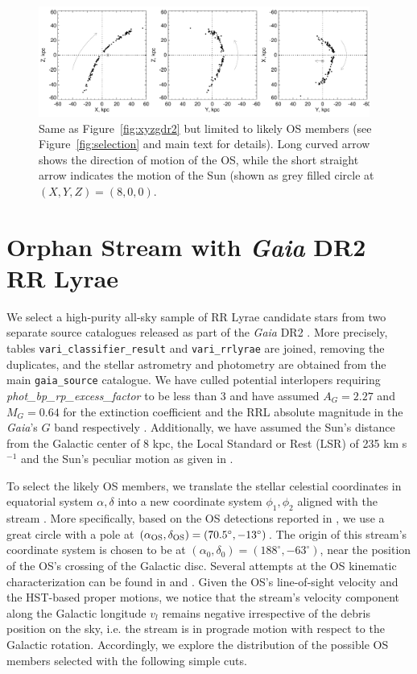 \documentclass[a4paper,useAMS,usenatbib]{mnras}
\newcommand{\Gaia}{{\it Gaia}}
\newcommand{\gaia}{\textit{Gaia} }
\begin{document}
%
\begin{figure}
  \centering
  \includegraphics[width=0.97\textwidth]{orphan_paper_xyz_members.pdf}
  \caption[]{Same as Figure~\ref{fig:xyzgdr2} but limited to likely OS
    members (see Figure~\ref{fig:selection} and main text for
    details). Long curved arrow shows the direction of motion of the
    OS, while the short straight arrow indicates the motion of the Sun
    (shown as grey filled circle at $(X,Y,Z)=(8,0,0)$.}
   \label{fig:xyzmem}
\end{figure}
%

\section{Orphan Stream with \gaia DR2 RR Lyrae}

We select a high-purity all-sky sample of RR Lyrae candidate stars
from two separate source catalogues released as part of the \gaia DR2
\citep[][]{Prusti2016, Brown2018}. More precisely, tables
\texttt{vari\_classifier\_result} and \texttt{vari\_rrlyrae}
\citep[see][]{Clementini2018,Holl2018} are joined, removing the
duplicates, and the stellar astrometry and photometry are obtained
from the main \texttt{gaia\_source} catalogue. We have culled
potential interlopers requiring \textit{phot\_bp\_rp\_excess\_factor}
to be less than 3 and have assumed $A_G=2.27$ and $M_G=0.64$ for the
extinction coefficient and the RRL absolute magnitude in the \Gaia's
$G$ band respectively \citep[see][for further
  details]{Iorio2018}. Additionally, we have assumed the Sun's
distance from the Galactic center of 8 kpc, the Local Standard or Rest
(LSR) of 235 km s$^{-1}$ and the Sun's peculiar motion as given in
\citet{LSR}.

To select the likely OS members, we translate the stellar celestial
coordinates in equatorial system $\alpha, \delta$ into a new
coordinate system $\phi_1, \phi_2$ aligned with the stream \citep[see
  e.g.][]{Koposov2010}. More specifically, based on the OS detections
reported in \citet{OS_V, OS_C, Newberg2010}, we use a great circle
with a pole at $(\alpha_{\rm OS}, \delta_{\rm OS})=(70.5^{\circ},
-13^{\circ})$. The origin of this stream's coordinate system is chosen
to be at $(\alpha_0, \delta_0)=(188^{\circ}, -63^{\circ})$, near the
position of the OS's crossing of the Galactic disc. Several attempts
at the OS kinematic characterization can be found in
\citet{Newberg2010} and \citet{Sohn2016}. Given the OS's line-of-sight
velocity and the HST-based proper motions, we notice that the stream's
velocity component along the Galactic longitude $v_l$ remains negative
irrespective of the debris position on the sky, i.e. the stream is in
prograde motion with respect to the Galactic rotation. Accordingly, we
explore the distribution of the possible OS members selected with the
following simple cuts.
\end{document}
